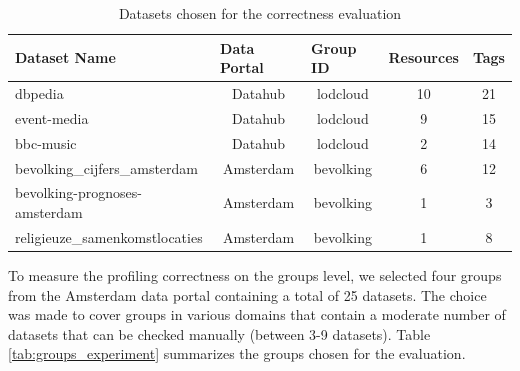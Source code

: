 \documentclass[runningheads,a4paper]{llncs}
\begin{document}
{\begin{table}[ht]
\centering
\footnotesize\setlength{\tabcolsep}{1.5pt}
\begin{tabular}{|l|c|c|c|c|}
\hline
\textbf{Dataset Name}          & \multicolumn{1}{l|}{\textbf{Data Portal}} & \multicolumn{1}{l|}{\textbf{Group ID}} & \multicolumn{1}{l|}{\textbf{Resources}} & \multicolumn{1}{l|}{\textbf{Tags}} \\ \hline
dbpedia                        & Datahub                                   & lodcloud                               & 10                                      & 21                                 \\ \hline
event-media                    & Datahub                                   & lodcloud                               & 9                                       & 15                                 \\ \hline
bbc-music                      & Datahub                                   & lodcloud                               & 2                                       & 14                                 \\ \hline
bevolking\_cijfers\_amsterdam  & Amsterdam                                 & bevolking                              & 6                                       & 12                                 \\ \hline
bevolking-prognoses-amsterdam  & Amsterdam                                 & bevolking                              & 1                                       & 3                                  \\ \hline
religieuze\_samenkomstlocaties & Amsterdam                                 & bevolking                              & 1                                       & 8                                  \\ \hline
\end{tabular}
\caption{Datasets chosen for the correctness evaluation}
\label{tab:datases_experiment}
\end{table}

To measure the profiling correctness on the groups level, we selected four groups from the Amsterdam data portal containing a total of 25 datasets. The choice was made to cover groups in various domains that contain a moderate number of datasets that can be checked manually (between 3-9 datasets). Table \ref{tab:groups_experiment} summarizes the groups chosen for the evaluation.

}
\end{document}
